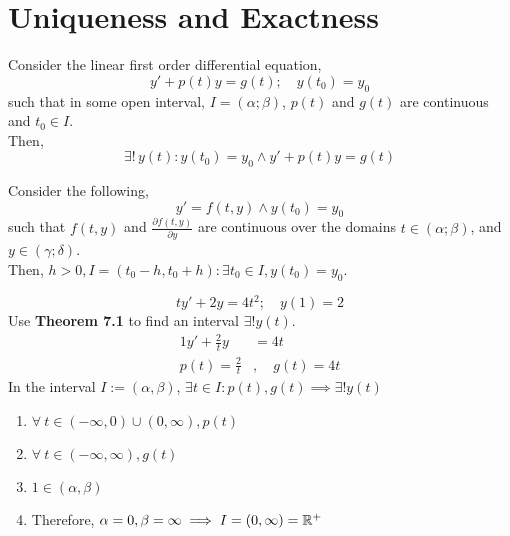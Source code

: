 \documentclass[twoside]{report}
\begin{document}
    \section{Uniqueness and Exactness}
    \begin{btheorem}
        Consider the linear first order differential equation,
        \begin{equation}
            y' + p(t)y = g(t);\quad y(t_{0}) = y_{0}
        \end{equation}
        such that in some open interval, $I = (\alpha; \beta)$, $p(t)$ and $g(t)$ are continuous and $t_{0} \in I$.\\
        Then,
        \begin{equation}
            \exists!\,y(t): y(t_{0}) = y_{0} \wedge y' + p(t)y = g(t)
        \end{equation}
    \end{btheorem}
    \begin{btheorem}
        Consider the following,
        \begin{equation} 
            y' = f(t, y) \wedge y(t_{0}) = y_{0}
        \end{equation}
        such that $f(t, y)$ and $\frac{\partial f(t, y)}{\partial y}$ are continuous over the domains $t \in (\alpha; \beta)$, and $y \in (\gamma; \delta)$.\\
        Then, $h > 0, I = (t_{0} - h, t_{0} + h): \exists t_{0} \in I, y(t_{0}) = y_{0}$.
    \end{btheorem}
    \begin{example}
        \begin{equation}
            ty' + 2y = 4t^{2};\quad y(1) = 2
        \end{equation}
        Use \textbf{Theorem 7.1} to find an interval $\exists!y(t)$.
        \begin{alignat}{1}
            y' + \frac{2}{t}y &= 4t\\
            p(t) = \frac{2}{t}&,\quad g(t) = 4t
        \end{alignat}
        In the interval $I := (\alpha, \beta)$, $\exists t \in I: p(t), g(t) \implies \exists! y(t)$
        \begin{enumerate}
            \item $\forall\ t \in (-\infty, 0)\cup(0,\infty), p(t)$
            \item $\forall\ t \in (-\infty, \infty), g(t)$
            \item $1 \in (\alpha,\beta)$
            \item Therefore, $\alpha = 0, \beta = \infty \implies I = (0, \infty) = \mathbb{R}^{+}$
        \end{enumerate}
    \end{example}
\end{document}
